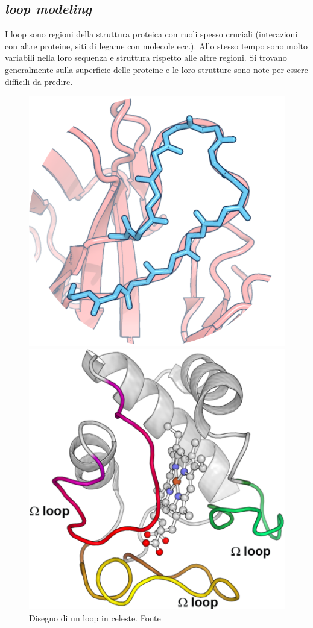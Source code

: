 \subsection{\textit{loop modeling}} \label{sec: loop-modeling}
{
I loop sono regioni della struttura proteica con ruoli spesso cruciali (interazioni con altre proteine, siti di legame con molecole ecc.). Allo stesso tempo sono molto variabili nella loro sequenza e struttura rispetto alle altre regioni. Si trovano generalmente sulla superficie delle proteine e le loro strutture sono note per essere difficili da predire.

\begin{figure}[!htb]
	\centering
	\includegraphics[scale= 1]{images/fread.png}
	\caption{Disegno di un loop in celeste. Fonte \cite{FREAD}}
	\label{fig:loop-example}
	\endminipage\hfill
	\centering
	\includegraphics[scale=0.3]{images/loops.png}

\end{figure}}
